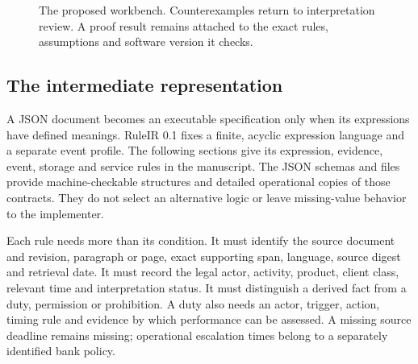 \begin{figure}[htbp]
\centering
{}
\caption{The proposed workbench. Counterexamples return to interpretation review.
A proof result remains attached to the exact rules, assumptions and software
version it checks.}
\label{fig:architecture}
\end{figure}

\subsection{The intermediate representation}

A JSON document becomes an executable specification only when its expressions
have defined meanings. RuleIR 0.1 fixes a finite, acyclic expression language and
a separate event profile. The following sections give its expression, evidence,
event, storage and service rules in the manuscript. The JSON schemas and
 files provide machine-checkable structures and detailed
operational copies of those contracts. They do not select an alternative logic
or leave missing-value behavior to the implementer.

Each rule needs more than its condition. It must identify the source document and
revision, paragraph or page, exact supporting span, language, source digest and
retrieval date. It must record the legal actor, activity, product, client class,
relevant time and interpretation status. It must distinguish a derived fact from
a duty, permission or prohibition. A duty also needs an actor, trigger, action,
timing rule and evidence by which performance can be assessed. A missing source
deadline remains missing; operational escalation times belong to a separately
identified bank policy.


